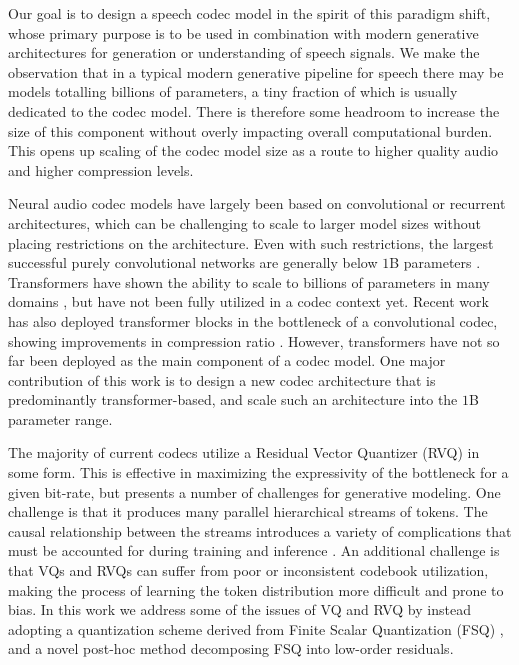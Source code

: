 \documentclass{article} %
\begin{document}
Our goal is to design a speech codec model in the spirit of this paradigm shift, whose primary purpose is to be used in combination with modern generative architectures for generation or understanding of speech signals.  We make the observation that in a typical modern generative pipeline for speech there may be models totalling billions of parameters, a tiny fraction of which is usually dedicated to the codec model. There is therefore some headroom to increase the size of this component without overly impacting overall computational burden. This opens up scaling of the codec model size as a route to higher quality audio and higher compression levels.

Neural audio codec models have largely been based on convolutional or recurrent architectures, which can be challenging to scale to larger model sizes without placing restrictions on the architecture. Even with such restrictions, the largest successful purely convolutional networks are generally below $1$B parameters \citep{woo2023}. Transformers \citep{vaswani2017attention} have shown the ability to scale to billions of parameters in many domains \citep{hoffmann2022}, but have not been fully utilized in a codec context yet. Recent work has also deployed transformer blocks in the bottleneck of a convolutional codec, showing improvements in compression ratio \citep{moshi}. However, transformers have not so far been deployed as the main component of a codec model. One major contribution of this work is to design a new codec architecture that is predominantly transformer-based, and scale such an architecture into the $1$B parameter range.

The majority of current codecs utilize a Residual Vector Quantizer (RVQ) \citep{zeghidour2021soundstream} in some form. This is effective in maximizing the expressivity of the bottleneck for a given bit-rate, but presents a number of challenges for generative modeling. One challenge is that it produces many parallel hierarchical streams of tokens. The causal relationship between the streams introduces a variety of complications that must be accounted for during training and inference \citep{borsos2023audiolm, copet2023simple, moshi}. An additional challenge is that VQs and RVQs can suffer from poor or inconsistent codebook utilization, making the process of learning the token distribution more difficult and {prone to bias}. In this work we address some of the issues of VQ and RVQ by instead adopting a quantization scheme derived from Finite Scalar Quantization (FSQ) \citep{FSQ}, and a novel post-hoc method decomposing FSQ into low-order residuals. %
\end{document}
